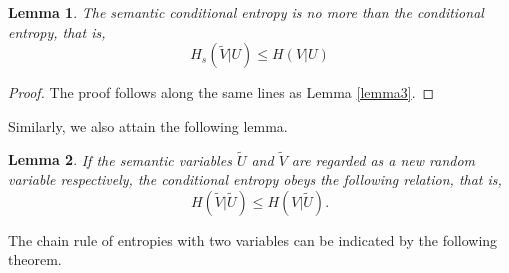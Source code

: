 \documentclass[12pt, draftclsnofoot,onecolumn]{IEEEtran}
\newtheorem{lemma}{\bf{Lemma}}
\begin{document}
\begin{lemma}\label{lemma4}
The semantic conditional entropy is no more than the conditional entropy, that is,
\begin{equation}
H_s\left(\tilde {V}| U\right)\leq H\left(V|U\right)
\end{equation}
\end{lemma}
\begin{proof}
The proof follows along the same lines as Lemma \ref{lemma3}.
\end{proof}

Similarly, we also attain the following lemma.
\begin{lemma}\label{lemma41}
If the semantic variables $\tilde{U}$ and $\tilde{V}$ are regarded as a new random variable respectively, the conditional entropy obeys the following relation, that is,
\begin{equation}
H\left(\tilde {V}| \tilde{U}\right)\leq H\left(V|\tilde{U}\right).
\end{equation}
\end{lemma}


The chain rule of entropies with two variables can be indicated by the following theorem.
\end{document}
